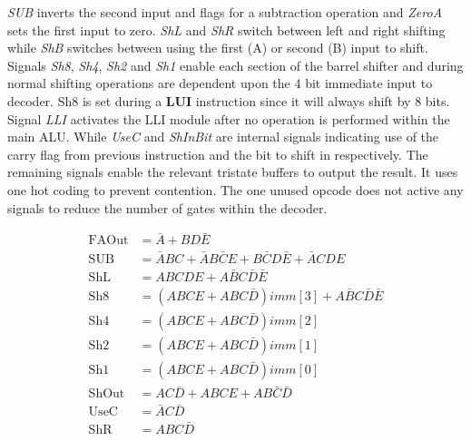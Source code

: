 \textit{SUB} inverts the second input and flags for a subtraction operation and \textit{ZeroA} sets the first input to zero. 
\textit{ShL} and \textit{ShR} switch between left and right shifting while \textit{ShB} switches between using the first (A) or second (B) input to shift. 
Signals \textit{Sh8}, \textit{Sh4}, \textit{Sh2} and \textit{Sh1} enable each section of the barrel shifter and during normal shifting operations are dependent upon the 4 bit immediate input to decoder. 
Sh8 is set during a \textbf{LUI} instruction since it will always shift by 8 bits. 
Signal \textit{LLI} activates the LLI module after no operation is performed within the main ALU. 
While \textit{UseC} and \textit{ShInBit} are internal signals indicating use of the carry flag from previous instruction and the bit to shift in respectively. 
The remaining signals enable the relevant tristate buffers to output the result. It uses one hot coding to prevent contention. 
The one unused opcode does not active any signals to reduce the number of gates within the decoder. 

\begin{align}
	\text{FAOut} &= \bar{A} + BD\bar{E} \label{eq:DecBasicS}\\
	\text{SUB} &= \bar{A}BC + \bar{A}B\bar{C}E + B\bar{C}D\bar{E} + \bar{A}CDE \\
	\text{ShL} &= ABCDE + A\bar{B}C\bar{D}\bar{E} \\
	\text{Sh8} &= (ABCE + ABC\bar{D})imm[3] + A\bar{B}C\bar{D}\bar{E} \\
	\text{Sh4} &= (ABCE + ABC\bar{D})imm[2] \\
	\text{Sh2} &= (ABCE + ABC\bar{D})imm[1] \\
	\text{Sh1} &= (ABCE + ABC\bar{D})imm[0] \\
	\text{ShOut} &= AC\bar{D} + ABCE + AB\bar{C}\bar{D} \\
	\text{UseC} &= \bar{A}C\bar{D} \\
	\text{ShR} &= ABC\bar{D} \label{eq:DecBasicF}
\end{align}

